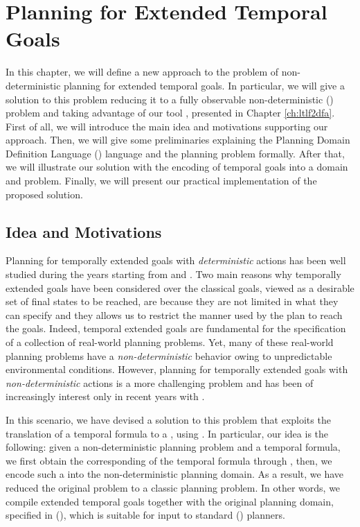 \chapter{Planning for Extended Temporal Goals}
In this chapter, we will define a new approach to the problem of non-deterministic planning for extended temporal goals. In particular, we will give a solution to this problem reducing it to a fully observable non-deterministic (\FOND) problem and taking advantage of our tool \LTLfToDFA, presented in Chapter \ref{ch:ltlf2dfa}. First of all, we will introduce the main idea and motivations supporting our approach. Then, we will give some preliminaries explaining the Planning Domain Definition Language (\PDDL) language and the \FOND planning problem formally. After that, we will illustrate our solution with the encoding of temporal goals into a \PDDL domain and problem. Finally, we will present our practical implementation of the proposed solution.
\section{Idea and Motivations}
Planning for temporally extended goals with \textit{deterministic} actions has been well studied during the years starting from \citep{bacchus1998planning} and \citep{doherty2001talplanner}. Two main reasons why temporally extended goals have been considered over the classical goals, viewed as a desirable set of final states to be reached, are because they are not limited in what they can specify and they allows us to restrict the manner used by the plan to reach the goals. Indeed, temporal extended goals are fundamental for the specification of a collection of real-world planning problems. Yet, many of these real-world planning problems have a \textit{non-deterministic} behavior owing to unpredictable environmental conditions. However, planning for temporally extended goals with \textit{non-deterministic} actions is a more challenging problem and has been of increasingly interest only in recent years with \citep{camacho2017non}.

In this scenario, we have devised a solution to this problem that exploits the translation of a temporal formula to a \DFA, using \LTLfToDFA. In particular, our idea is the following: given a non-deterministic planning problem and a temporal formula, we first obtain the corresponding \DFA of the temporal formula through \LTLfToDFA, then, we encode such a \DFA into the non-deterministic planning domain. As a result, we have reduced the original problem to a classic \FOND planning problem. In other words, we compile extended temporal goals together with the original planning domain, specified in (\PDDL), which is suitable for input to standard (\FOND) planners.
